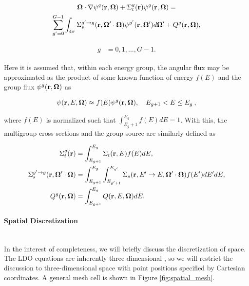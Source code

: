 \noindent\begin{minipage}{0.7\textwidth}
\begin{multline*}
\label{eq:mg_nte}
\mathbf\Omega \cdot \nabla \psi^g(\textbf{r},\mathbf\Omega) + \Sigma_t^g(\textbf{r}) \psi^g(\textbf{r},\mathbf\Omega) =  \\
\sum_{g'=0}^{G-1}\int_{4\pi} \Sigma_s^{g'\rightarrow g}(\textbf{r},\mathbf\Omega'\cdot\mathbf\Omega)
\psi^{g'}(\textbf{r},\mathbf\Omega')d\mathbf\Omega' + Q^g(\textbf{r},\mathbf\Omega),
\end{multline*}
\end{minipage}
\hspace{-0.5cm}
\begin{minipage}{0.3\textwidth}
\begin{align}
\begin{split}
g &= 0,1,\ldots,G-1.
\end{split}
\end{align}
\end{minipage}
\vspace{0.1cm}

\noindent Here it is assumed that, within each energy group, the angular flux may be
approximated as the product of some known function of energy $f(E)$ and the group flux
$\psi^g(\textbf{r}, \mathbf\Omega)$ as

\begin{equation}
\psi(\textbf{r},E,\mathbf\Omega) \approx f(E)\psi^g(\textbf{r},\mathbf\Omega), \quad E_{g+1} < E \leq E_{g}\:,
\end{equation}

\noindent where $f(E)$ is normalized such that $\int_{E_g+1}^{E_{g}}f(E)dE = 1$. With 
this, the multigroup cross sections and the group source are similarly defined
\cite{lm} as

\begin{align}
\Sigma_t^g(\textbf{r}) &= \int_{E_{g+1}}^{E_{g}}\Sigma_t(\textbf{r},E)f(E)dE, \\
\Sigma_s^{g'\rightarrow g}(\textbf{r},\mathbf\Omega'\cdot\mathbf\Omega) &= \int_{E_{g+1}}^{E_{g}}\int_{E_{g'+1}}^{E_{g'}}
\Sigma_s(\textbf{r}, E'\rightarrow E, \mathbf\Omega'\cdot\mathbf\Omega)f(E')dE'dE, \\
Q^g(\textbf{r},\mathbf\Omega) &= \int_{E_{g+1}}^{E_{g}}Q(\textbf{r},E,\mathbf\Omega)dE.
\end{align}

\paragraph{Spatial Discretization}\mbox{} \\

In the interest of completeness, we will briefly discuss the discretization of space.
The LDO equations are inherently three-dimensional \cite{ahrens}, so we will restrict
the discussion to three-dimensional space with point positions specified by Cartesian
coordinates. A general mesh cell is shown in Figure \ref{fig:spatial_mesh}.

